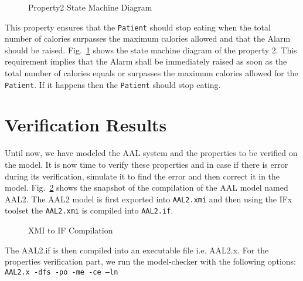 \documentclass[a4paper,twoside]{article}
\begin{document}
\begin{figure}[!h]
  \centering
  {}
  \caption{Property2 State Machine Diagram}
  \label{fig:property3stm}
 \end{figure}
 
  
This property ensures that the \texttt{Patient} should stop eating when the total number of calories surpasses the maximum calories allowed and that the Alarm should be raised. Fig.~\ref{fig:property3stm} shows the state machine diagram of the property 2. This requirement implies that the Alarm shall be immediately raised as soon as the total number of calories equals or surpasses the maximum calories allowed for the \texttt{Patient}. If it happens then the \texttt{Patient} should stop eating.  

\section{Verification Results}
\label{sec:results}
\noindent Until now, we have modeled the AAL system and the properties to be verified on the model. It is now time to verify these properties and in case if there is error during its verification, simulate it to find the error and then correct it in the model. Fig.~\ref{fig:xmi2if} shows the snapshot of the compilation of the AAL model named AAL2. The AAL2 model is first exported into \texttt{AAL2.xmi} and then using the IFx toolset the \texttt{AAL2.xmi} is compiled into \texttt{AAL2.if}.

\begin{figure}[!h]
  \centering
  {}
  \caption{XMI to IF Compilation}
  \label{fig:xmi2if}
 \end{figure}
  
 
The AAL2.if is then compiled into an executable file i.e. AAL2.x.
For the properties verification part, we run the model-checker with the following options:
\texttt{AAL2.x -dfs -po -me -ce –ln}
\end{document}

